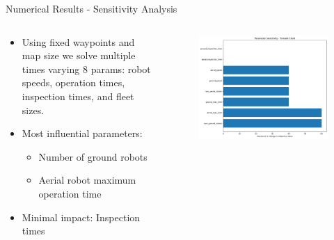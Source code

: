 \documentclass[11pt,xcolor={dvipsnames},hyperref={pdftex,pdfpagemode=UseNone,hidelinks,pdfdisplaydoctitle=true},usepdftitle=false]{beamer}
\begin{document}
    \begin{frame}{Numerical Results - Sensitivity Analysis}
    \begin{columns}
      \begin{column}{0.48\textwidth}
        \begin{itemize}
          \item Using fixed waypoints and map size we solve multiple times varying 8 params: robot speeds, operation times, inspection times, and fleet sizes.
          \item Most influential parameters:
            \begin{itemize}
              \item Number of ground robots
              \item Aerial robot maximum operation time
            \end{itemize}
          \item Minimal impact: Inspection times
        \end{itemize}
      \end{column}
      
      \begin{column}{0.48\textwidth}
        \begin{figure}
          \includegraphics[width=\textwidth]{figures/tornado_chart.pdf}
        \end{figure}
      \end{column}
    \end{columns}
  \end{frame}
\end{document}
